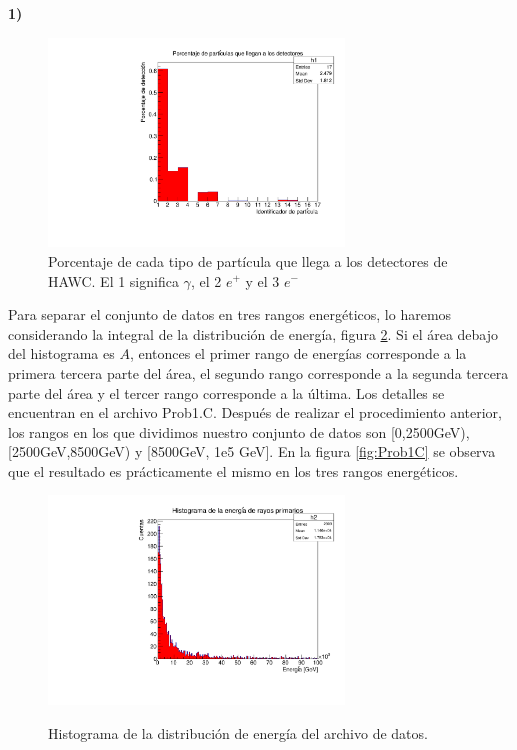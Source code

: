 \documentclass[11pt]{article}
\begin{document}
\textbf{1)}
\begin{figure}[H]
\centering
\includegraphics[width=0.7\textwidth]{../Figuras/Prob1A.pdf}
\caption{ Porcentaje de cada tipo de partícula que llega a los detectores de HAWC. El 1 significa $\gamma$, el 2 $e^+$ y el 3 $e^-$}
\label{fig:Prob1A}
\end{figure}
Para separar el conjunto de datos en tres rangos energéticos, lo haremos considerando la integral de la distribución de energía, figura \ref{fig:Prob1B}. Si el área debajo del histograma es $A$, entonces el primer rango de energías corresponde a la primera tercera parte del área, el segundo rango corresponde a la segunda tercera parte del área y el tercer rango corresponde a la última. Los detalles se encuentran en el archivo Prob1.C. Después de realizar el procedimiento anterior, los rangos en los que dividimos nuestro conjunto de datos son [0,2500GeV), [2500GeV,8500GeV) y [8500GeV, 1e5 GeV]. En la figura \ref{fig:Prob1C} se observa que el resultado es prácticamente el mismo en los tres rangos energéticos.


\begin{figure}[H]
\centering
{\includegraphics[width=0.7\textwidth]{../Figuras/Prob1B.pdf}}
\caption{ Histograma de la distribución de energía del archivo de datos.}
\label{fig:Prob1B}
\end{figure}
\end{document}
